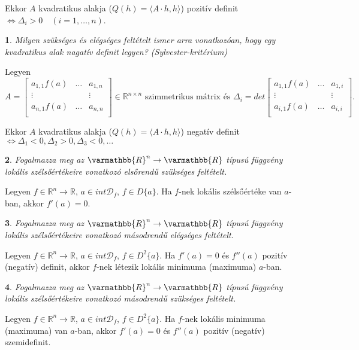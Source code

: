 \documentclass[a4paper]{article}
\def\R{\mathbb{R}}
\def\RR{\varmathbb{R}}
\theoremstyle{qstyle}
\newtheorem{question}{}{}
\begin{document}
	Ekkor $A$ kvadratikus alakja ($Q(h)=\langle{A\cdot h, h\rangle}$) pozitív definit $\Longleftrightarrow \Delta_i > 0 \quad (i = 1,\dots,n)$.
	
	\begin{question}
		Milyen szükséges és elégséges feltételt ismer arra vonatkozóan, hogy egy kvadratikus alak nagatív definit legyen? (Sylvester-kritérium)   
	\end{question}
	Legyen
	$$A = \begin{bmatrix} 
	a_{1,1}f(a) & \dots & a_{1,n} \\
	\vdots &  & \vdots \\
	a_{n,1}f(a) & \dots & a_{n,n} \\
	\end{bmatrix} \in \R^{n \times n} \text{ szimmetrikus mátrix és } \Delta_i = det \begin{bmatrix} 
	a_{1,1}f(a) & \dots & a_{1,i} \\
	\vdots &  & \vdots \\
	a_{i,1}f(a) & \dots & a_{i,i} \\
	\end{bmatrix}\text{.}$$
	
	 Ekkor $A$ kvadratikus alakja ($Q(h)=\langle{A\cdot h, h\rangle}$) negatív definit $\Longleftrightarrow \Delta_1 < 0, \Delta_2 > 0, \Delta_3 < 0, \dots$
	
	\begin{question}
		Fogalmazza meg az $\RR^n \to \RR$ típusú függvény lokális szélsőértékeire vonatkozó elsőrendű szükséges feltételt.  
	\end{question}
	Legyen $f \in \R^n \to \R$, $a \in int \mathcal{D}_f$, $f \in D\{a\}$. Ha $f$-nek lokális szélsőértéke van $a$-ban, akkor $f'(a)=0$.
	
	\begin{question}
		Fogalmazza meg az $\RR^n \to \RR$ típusú függvény lokális szélsőértékeire vonatkozó másodrendű elégséges feltételt.  
	\end{question}
	Legyen $f \in \R^n \to \R$, $a \in int \mathcal{D}_f$, $f \in D^2\{a\}$. Ha $f'(a) = 0$ és $f''(a)$ pozitív (negatív) definit, akkor $f$-nek létezik lokális minimuma (maximuma) $a$-ban.
	
	\begin{question}
		Fogalmazza meg az $\RR^n \to \RR$ típusú függvény lokális szélsőértékeire vonatkozó másodrendű szükséges feltételt.  
	\end{question}
	Legyen $f \in \R^n \to \R$, $a \in int \mathcal{D}_f$, $f \in D^2\{a\}$. Ha $f$-nek lokális minimuma (maximuma) van $a$-ban, akkor $f'(a)=0$ és $f''(a)$ pozitív (negatív) szemidefinit.
	
\end{document}
